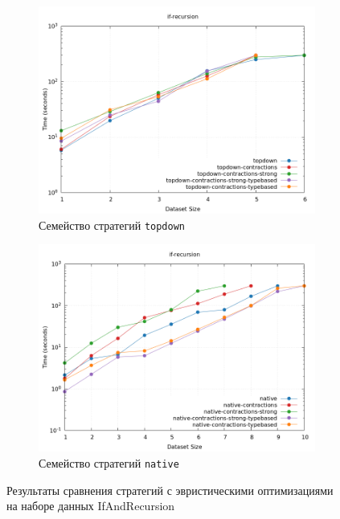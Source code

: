 \documentclass[../thesis.tex]{subfiles}
\begin{document}
\begin{figure}[h]
    \begin{subfigure}{0.5\textwidth}
    \includegraphics[width=\linewidth]{topdown_ifrec.png} 
    \caption{Семейство стратегий \texttt{topdown}}
    \label{heuristics_ifs_topdown}
    \end{subfigure}
    \begin{subfigure}{0.5\textwidth}
    \includegraphics[width=\linewidth]{native_ifrec.png}
    \caption{Семейство стратегий \texttt{native}}
    \label{heuristics_ifs_native}
    \end{subfigure}
    \caption{Результаты сравнения стратегий с эвристическими оптимизациями на наборе данных IfAndRecursion}
    \label{heuristics_ifs}
\end{figure}
\end{document}

